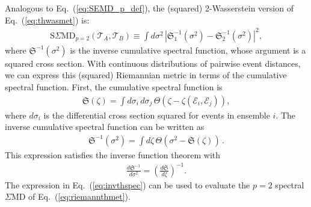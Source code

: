 \documentclass[letterpaper,11pt]{article}
\DeclareRobustCommand{\Eq}[1]{Eq.~(\ref{#1})}
\begin{document}
Analogous to \Eq{eq:SEMD_p_def}, the (squared) 2-Wasserstein version of \Eq{eq:thwasmet} is:
%
\begin{align}\label{eq:riemannthmet}
\text{S$\Sigma$MD}_{p=2}(\mathcal{T}_A, \mathcal{T}_B) \equiv \int d\sigma^2 \, \left|{\mathfrak S}_1^{-1}(\sigma^2)-{\mathfrak S}_2^{-1}(\sigma^2)\right|^2, 
\end{align}
%
where ${\mathfrak S}^{-1}(\sigma^2)$ is the inverse cumulative spectral function, whose argument is a squared cross section.
%
With continuous distributions of pairwise event distances, we can express this (squared) Riemannian metric in terms of the cumulative spectral function.
%
First, the cumulative spectral function is
%
\begin{align}
\mathfrak{S}(\zeta) = \int d\sigma_i\,d\sigma_j\, \Theta\left(\zeta - \zeta(\mathcal{E}_i, \mathcal{E}_j) \right),
\end{align}
%
where $d\sigma_i$ is the differential cross section squared for events in ensemble $i$.
%
The inverse cumulative spectral function can be written as
%
\begin{align}
\label{eq:invthspec}
\mathfrak{S}^{-1}(\sigma^2) = \int d\zeta\,\Theta\left(
\sigma^2 - \mathfrak{S}(\zeta)
\right)\,.
\end{align}
%
This expression satisfies the inverse function theorem with
\begin{align}
\frac{d\mathfrak{S}^{-1}}{d\sigma^2} = \left(\frac{d\mathfrak{S}}{d\zeta} \right)^{-1}.
\end{align}
%
The expression in \Eq{eq:invthspec} can be used to evaluate the $p = 2$ spectral $\Sigma$MD of \Eq{eq:riemannthmet}.
\end{document}
